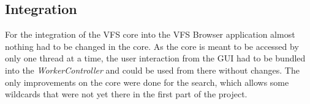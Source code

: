 \subsection{Integration}

For the integration of the VFS core into the VFS Browser application almost
nothing had to be changed in the core. As the core is meant to be accessed by
only one thread at a time, the user interaction from the GUI had to be bundled
into the \textit{WorkerController} and could be used from there without changes.
The only improvements on the core were done for the search, which allows some
wildcards that were not yet there in the first part of the project.
